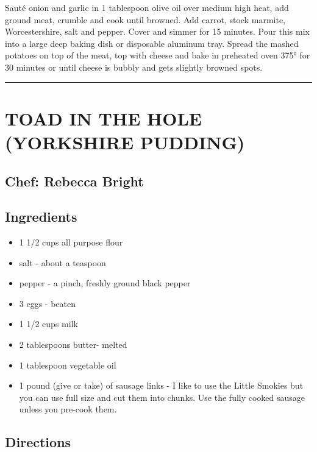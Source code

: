\documentclass[
]{book}
\providecommand{\tightlist}{%
  \setlength{\itemsep}{0pt}\setlength{\parskip}{0pt}}
\begin{document}
Sauté onion and garlic in 1 tablespoon olive oil over medium high heat, add ground meat,
crumble and cook until browned. Add carrot, stock marmite, Worcestershire, salt and pepper.
Cover and simmer for 15 minutes. Pour this mix into a large deep baking dish or disposable aluminum tray.
Spread the mashed potatoes on top of the meat, top with cheese and bake in preheated oven 375°
for 30 minutes or until cheese is bubbly and gets slightly browned spots.

\begin{center}\rule{0.5\linewidth}{0.5pt}\end{center}

\hypertarget{toad-in-the-hole-yorkshire-pudding}{%
\section*{TOAD IN THE HOLE (YORKSHIRE PUDDING)}\label{toad-in-the-hole-yorkshire-pudding}}


\hypertarget{chef-rebecca-bright-4}{%
\subsection*{Chef: Rebecca Bright}\label{chef-rebecca-bright-4}}


\hypertarget{ingredients-69}{%
\subsection*{Ingredients}\label{ingredients-69}}


\begin{itemize}
\tightlist
\item
  1 1/2 cups all purpose flour
\item
  salt - about a teaspoon
\item
  pepper - a pinch, freshly ground black pepper
\item
  3 eggs - beaten
\item
  1 1/2 cups milk
\item
  2 tablespoons butter- melted
\item
  1 tablespoon vegetable oil
\item
  1 pound (give or take) of sausage links - I like to use the Little Smokies but you can use full size and cut them into chunks. Use the fully cooked sausage unless you pre-cook them.
\end{itemize}

\hypertarget{directions-69}{%
\subsection*{Directions}\label{directions-69}}
\end{document}
